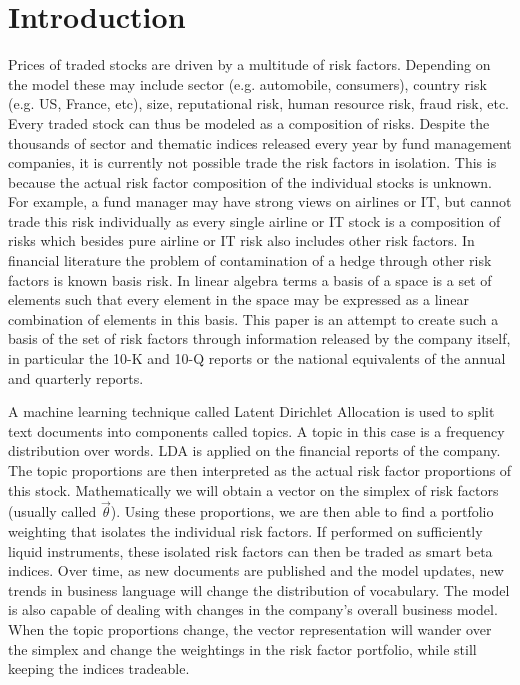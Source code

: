\documentclass[12pt,journal,letterpaper,oneside,onecolumn]{IEEEtran}
\begin{document}
\section{Introduction}
Prices of traded stocks are driven by a multitude of risk factors. Depending on the model these may include sector (e.g. automobile, consumers), country risk (e.g. US, France, etc), size, reputational risk, human resource risk, fraud risk, etc.
Every traded stock can thus be modeled as a composition of risks. Despite the thousands of sector and thematic indices released every year by fund management companies, it is currently not possible trade the risk factors in isolation. This is because the actual risk factor composition of the individual stocks is unknown. 
For example, a fund manager may have strong views on airlines or IT, but cannot trade this risk individually as every single airline or IT stock is a composition of risks which besides pure airline or IT risk also includes other risk factors. 
In financial literature the problem of contamination of a hedge through other risk factors is known basis risk.
In linear algebra terms a basis of a space is a set of elements such that every element in the space may be expressed as a linear combination of elements in this basis.
This paper is an attempt to create such a basis of the set of risk factors through information released by the company itself, in particular the 10-K and 10-Q reports or the national equivalents of the annual and quarterly reports.

A machine learning technique called Latent Dirichlet Allocation is
used to split text documents into components called topics.
A topic in this case is a frequency distribution over words.
LDA is applied on the financial reports of the company.
The topic proportions are then interpreted as the actual risk factor proportions of this stock.
Mathematically we will obtain a vector on the simplex of risk factors (usually called $\vec{\theta}$).
Using these proportions, we are then able to find a portfolio weighting that isolates the individual risk factors.
If performed on sufficiently liquid instruments, these isolated risk factors can then be traded as smart beta indices.
Over time, as new documents are published and the model updates, new trends in business language will change the distribution of vocabulary. 
The model is also capable of dealing with changes in the company's overall business model. When the topic proportions change, the vector representation will wander over the simplex and change the weightings in the risk factor portfolio, while still keeping the indices tradeable.
\end{document}
